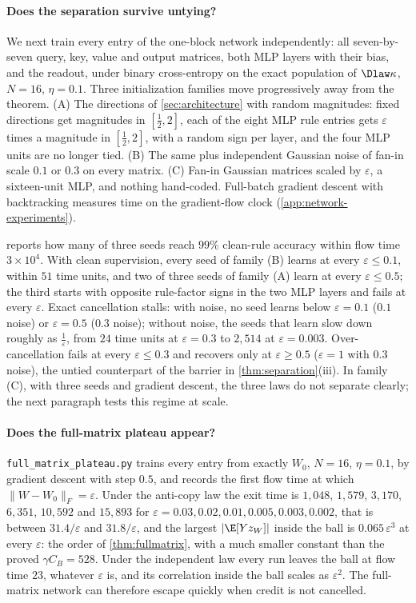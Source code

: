 \paragraph{Does the separation survive untying?}
We next train every entry of the one-block network independently: all seven-by-seven query, key, value and output matrices,
both MLP layers with their bias, and the readout, under binary cross-entropy on the exact population of $\Dlaw\kappa$, $N=16$, $\eta=0.1$.
Three initialization families move progressively away from the theorem.
(A) The directions of \cref{sec:architecture} with random magnitudes: fixed directions get magnitudes in $[\tfrac{1}{2},2]$,
each of the eight MLP rule entries gets $\varepsilon$ times a magnitude in $[\tfrac{1}{2},2]$, with a random sign per layer, and the four MLP units are no longer tied.
(B) The same plus independent Gaussian noise of fan-in scale $0.1$ or $0.3$ on every matrix.
(C) Fan-in Gaussian matrices scaled by $\varepsilon$, a sixteen-unit MLP, and nothing hand-coded.
Full-batch gradient descent with backtracking measures time on the gradient-flow clock (\cref{app:network-experiments}).

 reports how many of three seeds reach $99\%$ clean-rule accuracy within flow time $3\times10^4$.
With clean supervision, every seed of family (B) learns at every $\varepsilon\le0.1$, within $51$ time units,
and two of three seeds of family (A) learn at every $\varepsilon\le0.5$; the third starts with opposite rule-factor signs in the two MLP layers and fails at every $\varepsilon$.
Exact cancellation stalls: with noise, no seed learns below $\varepsilon=0.1$ ($0.1$ noise) or $\varepsilon=0.5$ ($0.3$ noise);
without noise, the seeds that learn slow down roughly as $\tfrac{1}{\varepsilon}$, from $24$ time units at $\varepsilon=0.3$ to $2{,}514$ at $\varepsilon=0.003$.
Over-cancellation fails at every $\varepsilon\le0.3$ and recovers only at $\varepsilon\ge0.5$ ($\varepsilon=1$ with $0.3$ noise),
the untied counterpart of the barrier in \cref{thm:separation}(iii).
In family (C), with three seeds and gradient descent, the three laws do not separate clearly; the next paragraph tests this regime at scale.

\paragraph{Does the full-matrix plateau appear?}
\texttt{full\_matrix\_plateau.py} trains every entry from exactly $W_0$, $N=16$, $\eta=0.1$, by gradient descent with step $0.5$, and records the first flow time at which
$\|W-W_0\|_F=\varepsilon$. Under the anti-copy law the exit time is $1{,}048$, $1{,}579$, $3{,}170$, $6{,}351$, $10{,}592$ and $15{,}893$ for
$\varepsilon=0.03,0.02,0.01,0.005,0.003,0.002$, that is between $31.4/\varepsilon$ and $31.8/\varepsilon$, and the largest $|\E[Yz_W]|$ inside the ball is $0.065\,\varepsilon^3$ at every $\varepsilon$:
the order of \cref{thm:fullmatrix}, with a much smaller constant than the proved $\gamma C_B=528$. Under the independent law every run leaves the ball at flow time $23$,
whatever $\varepsilon$ is, and its correlation inside the ball scales as $\varepsilon^2$. The full-matrix network can therefore escape quickly when credit is not cancelled.

